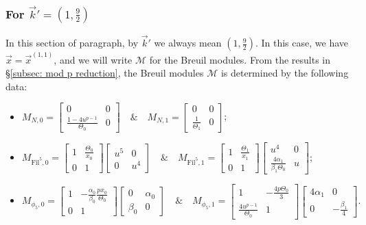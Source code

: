 \documentclass[11pt]{amsart}
\theoremstyle{definition}
\numberwithin{equation}{subsection}
\theoremstyle{plain}
\theoremstyle{plain}
\theoremstyle{plain}
\theoremstyle{plain}
\theoremstyle{plain}
\theoremstyle{plain}
\theoremstyle{plain}
\theoremstyle{plain}
\theoremstyle{plain}
\theoremstyle{plain}
\theoremstyle{plain}
\theoremstyle{plain}
\theoremstyle{definition}
\theoremstyle{definition}
\theoremstyle{definition}
\theoremstyle{remark}
\renewcommand{\(}{\textup{(}}
\renewcommand{\)}{\textup{)}}
\newcommand{\cM}{\mathcal{M}}
\newcommand{\Fil}{\mathrm{Fil}}
\newcommand{\vx}{\vec{x}}
\newcommand{\vk}{\vec{k}}
\begin{document}
\subsubsection{\textbf{For $\vk'=(1,\frac{9}{2})$}}\label{subsubsec: vr=(1,5), vk=(1,9/2)}
In this section of paragraph, by $\vk'$ we always mean $(1,\frac{9}{2})$. In this case, we have $\vx=\vx^{(1,1)}$, and we will write $\cM$ for the Breuil modules. From the results in \S\ref{subsec: mod p reduction}, the Breuil modules $\cM$ is determined by the following data:
\begin{itemize}[leftmargin=*]
  \item $M_{N,0}=
  \begin{bmatrix}
    0 & 0 \\
    \frac{1-4u^{p-1}}{\Theta_0} & 0
  \end{bmatrix}\quad\&\quad
  M_{N,1}=
  \begin{bmatrix}
    0 & 0 \\
    \frac{1}{\Theta_1} & 0
  \end{bmatrix}$;
  \item $M_{\Fil^5,0}=
  \begin{bmatrix}
    1 & \frac{\Theta_0}{x_0} \\
    0 & 1
  \end{bmatrix}
  \begin{bmatrix}
    u^5 & 0 \\
    0 & u^4
  \end{bmatrix}\quad\&\quad
  M_{\Fil^5,1}=
  \begin{bmatrix}
    1 & \frac{\Theta_1}{x_1} \\
    0 & 1
  \end{bmatrix}
  \begin{bmatrix}
    u^4 & 0 \\
    \frac{4\alpha_1}{\beta_1\Theta_0} & u
  \end{bmatrix}$;
  \item $M_{\phi_5,0}=
  \begin{bmatrix}
    1 & -\frac{\alpha_0}{\beta_0}\frac{px_0}{\Theta_0} \\
    0 & 1
  \end{bmatrix}
  \begin{bmatrix}
    0 & \alpha_0 \\
    \beta_0 & 0
  \end{bmatrix}\quad\&\quad
  M_{\phi_5,1}=
  \begin{bmatrix}
    1 & -\frac{4p\Theta_0}{3} \\
    \frac{4u^{p-1}}{\Theta_0} & 1
  \end{bmatrix}
  \begin{bmatrix}
    4\alpha_1 & 0 \\
    0 & -\frac{\beta_1}{4}
  \end{bmatrix}.$
\end{itemize}
\end{document}

